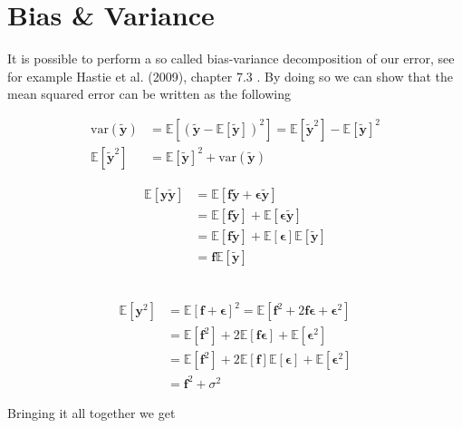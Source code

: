 \documentclass[twoside,11pt]{report}
\begin{document}
\section{Bias \& Variance}
\label{sec:biasvariance}

It is possible to perform a so called bias-variance decomposition of our error, 
see for example Hastie et al. (2009), chapter 7.3 \cite{hastie01statisticallearning}.
By doing so we can show that the mean squared error can be written as the following

\begin{minipage}[t]{.48\linewidth}
\begin{align*}
    \text{var}(\mathbf{\tilde{y}}) &= \mathbb{E}\left[\left(\tilde{\mathbf{y}}-\mathbb{E}\left[\mathbf{\tilde{y}}\right]\right)^2\right] 
         = \mathbb{E}[\mathbf{\tilde{y}}^2] - \mathbb{E}[\mathbf{\tilde{y}}]^2\\
    \mathbb{E}[\mathbf{\tilde{y}}^2] &= \mathbb{E}[\mathbf{\tilde{y}}]^2 + \text{var}(\mathbf{\tilde{y}})
\end{align*}
\end{minipage}
\hspace{2mm}
\begin{minipage}[t]{.45\linewidth}
\begin{align*}
    \mathbb{E}[\mathbf{y\tilde{y}}] & = \mathbb{E}[\mathbf{f\tilde{y}} + \mathbf{\epsilon\tilde{y}}]\\
& = \mathbb{E}[\mathbf{f\tilde{y}}] + \mathbb{E}[\mathbf{\epsilon\tilde{y}}]\\
& = \mathbb{E}[\mathbf{f\tilde{y}}] + \mathbb{E}[\mathbf{\epsilon}]\mathbb{E}[\mathbf{\tilde{y}}]\\
& = \mathbf{f}\mathbb{E}[\mathbf{\tilde{y}}]
\end{align*}
\end{minipage}\\
\begin{align*}
\mathbb{E}[\mathbf{y}^2] & = \mathbb{E}[\mathbf{f} + \mathbf{\epsilon}]^2 = \mathbb{E}[\mathbf{f}^2 + 2\mathbf{f}\mathbf{\epsilon} + \mathbf{\epsilon}^2]\\
& = \mathbb{E}[\mathbf{f}^2] + 2\mathbb{E}[\mathbf{f}\mathbf{\epsilon}] + \mathbb{E}[\mathbf{\epsilon}^2]\\
& = \mathbb{E}[\mathbf{f}^2] + 2\mathbb{E}[\mathbf{f}]\mathbb{E}[\mathbf{\epsilon}] + \mathbb{E}[\mathbf{\epsilon}^2]\\
& = \mathbf{f}^2 + \sigma^2
\end{align*}
\begin{center}
 Bringing it all together we get 
\end{center}
\end{document}

